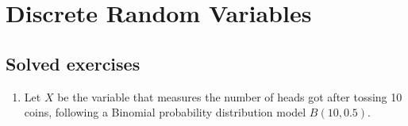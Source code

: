 
\chapter{Discrete Random Variables}


\section{Solved exercises}
\begin{enumerate}[leftmargin=*] 

\item Let $X$ be the variable that measures the number of heads got after tossing 10 coins, following a Binomial probability distribution model $B(10,0.5)$.
\begin{enumerate}


\end{enumerate}
\end{enumerate}
